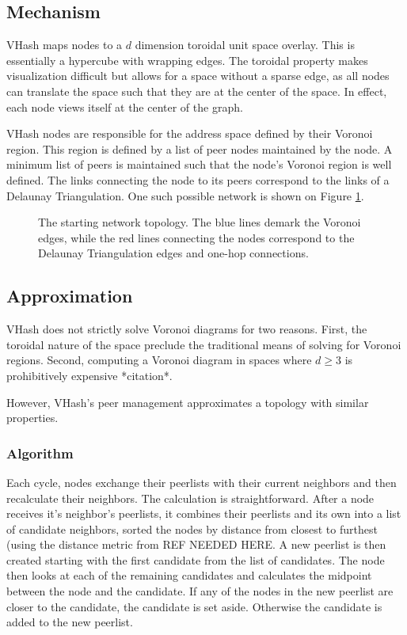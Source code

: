 \documentclass{IEEEtran}
\begin{document}
\subsection{Mechanism}
VHash maps nodes to a $d$ dimension toroidal unit space overlay. This is essentially a hypercube with wrapping edges. The toroidal property makes visualization difficult but allows for a space without a sparse edge, as all nodes can translate the space such that they are at the center of the space.  In effect, each node views itself at the center of the graph.

VHash nodes are responsible for the address space defined by their Voronoi region. This region is defined by a list of peer nodes maintained by the node. A minimum list of peers is maintained such that the node's Voronoi region is well defined. The links connecting the node to its peers correspond to the links of a Delaunay Triangulation.  One such possible network is shown on Figure \ref{churninit}.


\begin{figure}
    \caption{The starting network topology.  The blue lines demark the Voronoi edges, while the red lines connecting the nodes correspond to the Delaunay Triangulation edges and one-hop connections.}
    \label{churninit}
\end{figure}

\subsection{Approximation}

VHash does not strictly solve Voronoi diagrams \cite{voronoi} for two reasons.  First, the toroidal nature of the space preclude the traditional means of solving for Voronoi regions. Second, computing a Voronoi diagram in spaces where $d \geq 3$ is prohibitively expensive *citation*.


However, VHash's peer management approximates a topology with similar properties. 
\subsubsection{Algorithm}
Each cycle, nodes exchange their peerlists with their current neighbors and then recalculate their neighbors.  
The calculation is straightforward.  After a node receives it's neighbor's peerlists, it combines their peerlists and its own into a list of candidate neighbors, sorted the nodes by distance from closest to furthest (using the distance metric from REF NEEDED HERE.  A new peerlist is then created starting with the first candidate from the list of candidates.  The node then looks at each of the remaining candidates and calculates the midpoint between the node and the candidate.  If any of the nodes in the new peerlist are closer to the candidate, the candidate is set aside.  Otherwise the candidate is added to the new peerlist.
\end{document}
